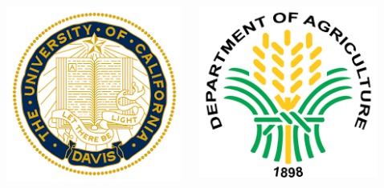 \documentclass[11pt,xcolor=dvipsnames]{beamer}
\begin{document}
\begin{frame}
\begin{overlayarea}{12cm}{4cm}
{\begin{columns}
\begin{column}{0.08\linewidth}
\end{column}
\begin{column}{0.08\linewidth}
\includegraphics[width=0.9\linewidth]{images/uc_davis.png}
\end{column}
\begin{column}{0.08\linewidth}
\includegraphics[width=0.9\linewidth]{images/doa.png}
\end{column}
\begin{column}{0.08\linewidth}

\end{column}
\end{columns}}
\end{overlayarea}
\end{frame}
\end{document}
